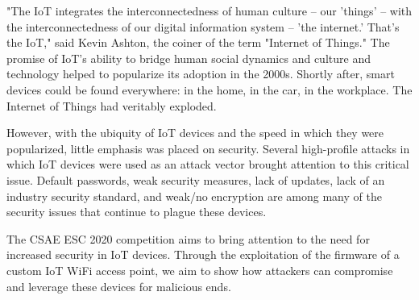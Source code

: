 "The IoT integrates the interconnectedness of human culture -- our 'things' -- with the interconnectedness of our digital information system -- 'the internet.' That's the IoT," said Kevin Ashton, the coiner of the term "Internet of Things." The promise of IoT's ability to bridge human social dynamics and culture and technology helped to popularize its adoption in the 2000s. Shortly after, smart devices could be found everywhere: in the home, in the car, in the workplace. The Internet of Things had veritably exploded. 

However, with the ubiquity of IoT devices and the speed in which they were popularized, little emphasis was placed on security. Several high-profile attacks in which IoT devices were used as an attack vector brought attention to this critical issue. Default passwords, weak security measures, lack of updates, lack of an industry security standard, and weak/no encryption are among many of the security issues that continue to plague these devices. 

The CSAE ESC 2020 competition aims to bring attention to the need for increased security in IoT devices. Through the exploitation of the firmware of a custom IoT WiFi access point, we aim to show how attackers can compromise and leverage these devices for malicious ends. 